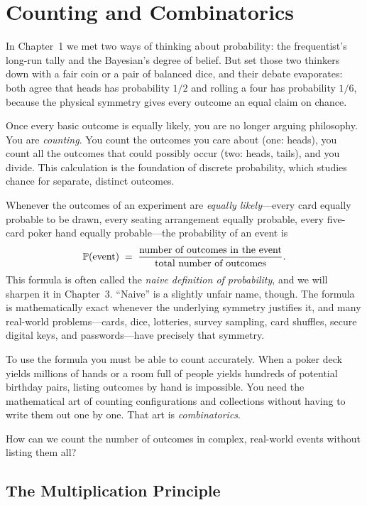 \chapter{Counting and Combinatorics}

In Chapter~1 we met two ways of thinking about probability: the frequentist's
long-run tally and the Bayesian's degree of belief. But set those two thinkers down
with a fair coin or a pair of balanced dice, and their debate evaporates: both agree
that heads has probability $1/2$ and rolling a four has probability $1/6$, because
the physical symmetry gives every outcome an equal claim on chance.

Once every basic outcome is equally likely, you are no longer arguing philosophy.
You are \emph{counting}. You count the outcomes you care about (one: heads), you
count all the outcomes that could possibly occur (two: heads, tails), and you divide.
This calculation is the foundation of discrete probability, which studies chance for separate, distinct outcomes.

Whenever the outcomes of an experiment are \emph{equally likely}---every card equally
probable to be drawn, every seating arrangement equally probable, every five-card poker
hand equally probable---the probability of an event is
\[
  \P(\text{event}) \;=\; \frac{\text{number of outcomes in the event}}{\text{total number of outcomes}}.
\]
This formula is often called the \emph{naive definition of probability}, and we will
sharpen it in Chapter~3. ``Naive'' is a slightly unfair name, though. The formula is mathematically
exact whenever the underlying symmetry justifies it, and many
real-world problems---cards, dice, lotteries, survey sampling, card shuffles, secure digital keys,
and passwords---have precisely that symmetry.

To use the formula you must be able to count accurately. When a poker deck yields millions of hands or a room full of people yields
hundreds of potential birthday pairs, listing outcomes by hand is impossible. You need the
mathematical art of counting configurations and collections without having to write them
out one by one. That art is \emph{combinatorics}.

\begin{focusbox}
How can we count the number of outcomes in complex, real-world events without listing them all?
\end{focusbox}

\section{The Multiplication Principle}
\label{ch2:multiplication}

